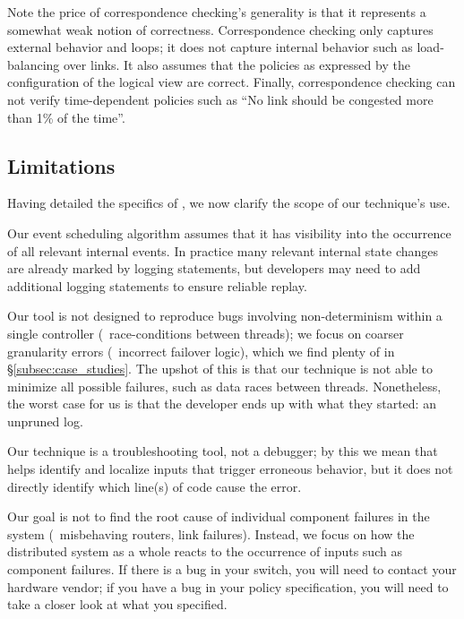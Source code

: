 Note the price of correspondence checking's generality is that it represents
a somewhat weak notion of
correctness. Correspondence checking only captures external behavior and
loops; it does not capture internal behavior such as load-balancing
over links. It also assumes that the policies as expressed by the
configuration of the logical view are correct. Finally, correspondence
checking can not verify
time-dependent policies such as ``No link should be congested more than 1\% of
the time''.

\subsection{Limitations}
\label{subsec:non_goals}

Having detailed the specifics of \simulator, we now
clarify the scope of our technique's use.

 Our event scheduling algorithm assumes that
it has visibility into the occurrence of all relevant internal events. In
practice many relevant internal state changes are already marked by logging
statements, but developers may need to add additional
logging statements to ensure reliable replay.

 Our tool is not designed to reproduce bugs
involving non-determinism within a single controller (\eg~race-conditions between threads);
we focus on coarser granularity errors (\eg~incorrect failover logic), which we find plenty of
in \S\ref{subsec:case_studies}. The upshot of
this is that our technique is not able to minimize all possible failures, such as
data races between threads.
Nonetheless, the worst case for us is that the developer ends up with what they started:
an unpruned log.


 Our technique is a troubleshooting tool, not a debugger;
by this we mean that \simulator{} helps identify and localize inputs that
trigger erroneous behavior, but it does not directly identify which
line(s) of code cause the error.

 Our goal is not to find the root
cause of individual component failures in the system (\eg~misbehaving routers,
link failures). Instead, we focus on
how the distributed system as a whole reacts to the occurrence of inputs such
as component failures.
If there is a bug in your switch, you will need to contact your hardware vendor;
if you have a bug in your policy specification, you will need to take a closer look at what you specified.

